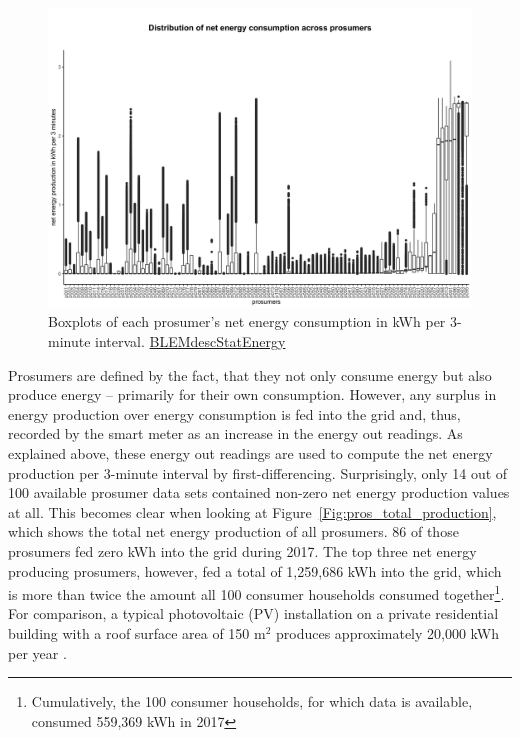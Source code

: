 \begin{figure}[htbp]
 \centering
\includegraphics[width=\textwidth]{thesis/graphs/prosumer_boxplots_consumption.jpg}
\caption[Boxplots of each prosumer's net energy consumption in kWh per 3-minute interval]{Boxplots of each prosumer's net energy consumption in kWh per 3-minute interval. \quantnet\href{ }{BLEMdescStatEnergy}}
\label{Fig:pros_boxplots_consumption}
\end{figure}

Prosumers are defined by the fact, that they not only consume energy but also produce energy -- primarily for their own consumption. However, any surplus in energy production over energy consumption is fed into the grid and, thus, recorded by the smart meter as an increase in the energy out readings. As explained above, these energy out readings are used to compute the net energy production per 3-minute interval by first-differencing. Surprisingly, only 14 out of 100 available prosumer data sets contained non-zero net energy production values at all. This becomes clear when looking at Figure~\ref{Fig:pros_total_production}, which shows the total net energy production of all prosumers. 86 of those prosumers fed zero kWh into the grid during 2017. The top three net energy producing prosumers, however, fed a total of 1,259,686 kWh into the grid, which is more than twice the amount all 100 consumer households consumed together\footnote{Cumulatively, the 100 consumer households, for which data is available, consumed 559,369 kWh in 2017}. For comparison, a typical photovoltaic (PV) installation on a private residential building with a roof surface area of 150 m$^2$ produces approximately 20,000 kWh per year \citep{energieatlas:2018}.

